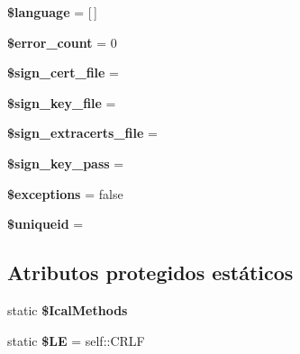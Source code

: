 \begin{DoxyCompactItemize}
\mbox{\label{classPHPMailer_1_1PHPMailer_1_1PHPMailer_a3eacca1a5881d957a324ef56778b7497}} 
{\bfseries \$language} = \mbox{[}$\,$\mbox{]}
\item 
\mbox{\label{classPHPMailer_1_1PHPMailer_1_1PHPMailer_af2ac457d7329902e1fa3223b67c02b45}} 
{\bfseries \$error\+\_\+count} = 0
\item 
\mbox{\label{classPHPMailer_1_1PHPMailer_1_1PHPMailer_aa75aacf03a6e1b3cf142ccd063468ce2}} 
{\bfseries \$sign\+\_\+cert\+\_\+file} = \textquotesingle{}\textquotesingle{}
\item 
\mbox{\label{classPHPMailer_1_1PHPMailer_1_1PHPMailer_a8a4a620f585e1b58d584b22ae04d7573}} 
{\bfseries \$sign\+\_\+key\+\_\+file} = \textquotesingle{}\textquotesingle{}
\item 
\mbox{\label{classPHPMailer_1_1PHPMailer_1_1PHPMailer_a3a4d27a2b83ee65a9d6707d57ef927d7}} 
{\bfseries \$sign\+\_\+extracerts\+\_\+file} = \textquotesingle{}\textquotesingle{}
\item 
\mbox{\label{classPHPMailer_1_1PHPMailer_1_1PHPMailer_ac2bbe3531f2a9822a5a1934ccbc444b0}} 
{\bfseries \$sign\+\_\+key\+\_\+pass} = \textquotesingle{}\textquotesingle{}
\item 
\mbox{\label{classPHPMailer_1_1PHPMailer_1_1PHPMailer_a97a19fafc630f93dc1dd50ffed28c9e0}} 
{\bfseries \$exceptions} = false
\item 
\mbox{\label{classPHPMailer_1_1PHPMailer_1_1PHPMailer_a8c3d7bfab5808d529f4397a1d9a670bf}} 
{\bfseries \$uniqueid} = \textquotesingle{}\textquotesingle{}
\end{DoxyCompactItemize}
\subsection*{Atributos protegidos estáticos}
\begin{DoxyCompactItemize}
\item 
static {\bfseries \$\+Ical\+Methods}
\item 
\mbox{\label{classPHPMailer_1_1PHPMailer_1_1PHPMailer_ac244654521fed43fd34223fbf822455e}} 
static {\bfseries \$\+LE} = self\+::\+C\+R\+LF
\end{DoxyCompactItemize}


